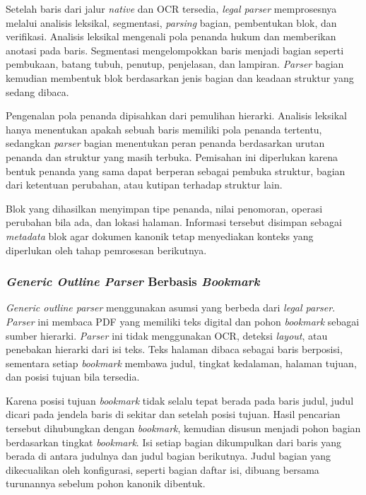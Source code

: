 Setelah baris dari jalur \textit{native} dan OCR tersedia, \textit{legal parser} memprosesnya melalui analisis leksikal, segmentasi, \textit{parsing} bagian, pembentukan blok, dan verifikasi.
Analisis leksikal mengenali pola penanda hukum dan memberikan anotasi pada baris.
Segmentasi mengelompokkan baris menjadi bagian seperti pembukaan, batang tubuh, penutup, penjelasan, dan lampiran.
\textit{Parser} bagian kemudian membentuk blok berdasarkan jenis bagian dan keadaan struktur yang sedang dibaca.

Pengenalan pola penanda dipisahkan dari pemulihan hierarki.
Analisis leksikal hanya menentukan apakah sebuah baris memiliki pola penanda tertentu, sedangkan \textit{parser} bagian menentukan peran penanda berdasarkan urutan penanda dan struktur yang masih terbuka.
Pemisahan ini diperlukan karena bentuk penanda yang sama dapat berperan sebagai pembuka struktur, bagian dari ketentuan perubahan, atau kutipan terhadap struktur lain.

Blok yang dihasilkan menyimpan tipe penanda, nilai penomoran, operasi perubahan bila ada, dan lokasi halaman.
Informasi tersebut disimpan sebagai \textit{metadata} blok agar dokumen kanonik tetap menyediakan konteks yang diperlukan oleh tahap pemrosesan berikutnya.

\subsubsection{\textit{Generic Outline Parser} Berbasis \textit{Bookmark}}
\label{sec:solusi-parser-generic}

\textit{Generic outline parser} menggunakan asumsi yang berbeda dari \textit{legal parser}.
\textit{Parser} ini membaca PDF yang memiliki teks digital dan pohon \textit{bookmark} sebagai sumber hierarki.
\textit{Parser} ini tidak menggunakan OCR, deteksi \textit{layout}, atau penebakan hierarki dari isi teks.
Teks halaman dibaca sebagai baris berposisi, sementara setiap \textit{bookmark} membawa judul, tingkat kedalaman, halaman tujuan, dan posisi tujuan bila tersedia.

Karena posisi tujuan \textit{bookmark} tidak selalu tepat berada pada baris judul, judul dicari pada jendela baris di sekitar dan setelah posisi tujuan.
Hasil pencarian tersebut dihubungkan dengan \textit{bookmark}, kemudian disusun menjadi pohon bagian berdasarkan tingkat \textit{bookmark}.
Isi setiap bagian dikumpulkan dari baris yang berada di antara judulnya dan judul bagian berikutnya.
Judul bagian yang dikecualikan oleh konfigurasi, seperti bagian daftar isi, dibuang bersama turunannya sebelum pohon kanonik dibentuk.

